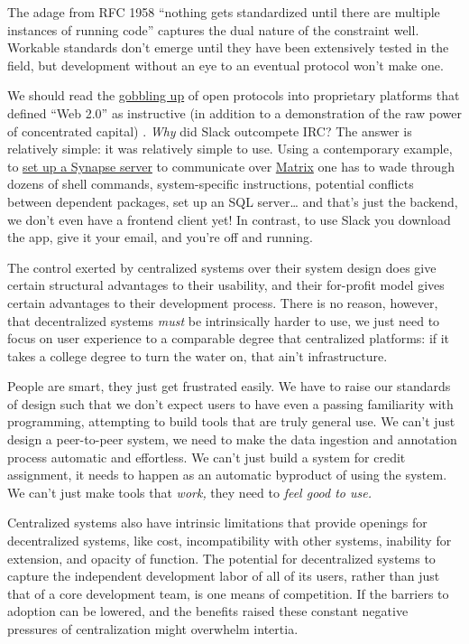 \documentclass[10pt]{article}
\begin{document}
\begin{multicols}{2}
The adage from RFC 1958 ``nothing gets standardized until there are
multiple instances of running code'' \cite{carpenterRFC1958Architectural1996}  captures the dual nature of the
constraint well. Workable standards don't emerge until they have been
extensively tested in the field, but development without an eye to an
eventual protocol won't make one.

We should read the
\href{https://en.wikipedia.org/wiki/Embrace,_extend,_and_extinguish}{gobbling
up} of open protocols into proprietary platforms that defined ``Web
2.0'' as instructive (in addition to a demonstration of the raw power of
concentrated capital) \cite{markoffTomorrowWorldWide1996} .
\emph{Why} did Slack outcompete IRC? The answer is relatively simple: it
was relatively simple to use. Using a contemporary example, to
\href{https://matrix-org.github.io/synapse/latest/setup/installation.html}{set
up a Synapse server} to communicate over
\href{https://matrix.org/docs/spec/}{Matrix} one has to wade through
dozens of shell commands, system-specific instructions, potential
conflicts between dependent packages, set up an SQL server\ldots{} and
that's just the backend, we don't even have a frontend client yet! In
contrast, to use Slack you download the app, give it your email, and
you're off and running.

The control exerted by centralized systems over their system design does
give certain structural advantages to their usability, and their
for-profit model gives certain advantages to their development process.
There is no reason, however, that decentralized systems \emph{must} be
intrinsically harder to use, we just need to focus on user experience to
a comparable degree that centralized platforms: if it takes a college
degree to turn the water on, that ain't infrastructure.

People are smart, they just get frustrated easily. We have to raise our
standards of design such that we don't expect users to have even a
passing familiarity with programming, attempting to build tools that are
truly general use. We can't just design a peer-to-peer system, we need
to make the data ingestion and annotation process automatic and
effortless. We can't just build a system for credit assignment, it needs
to happen as an automatic byproduct of using the system. We can't just
make tools that \emph{work,} they need to \emph{feel good to use.}

Centralized systems also have intrinsic limitations that provide
openings for decentralized systems, like cost, incompatibility with
other systems, inability for extension, and opacity of function. The
potential for decentralized systems to capture the independent
development labor of all of its users, rather than just that of a core
development team, is one means of competition. If the barriers to
adoption can be lowered, and the benefits raised these constant negative
pressures of centralization might overwhelm intertia.


\end{multicols}
\end{document}
